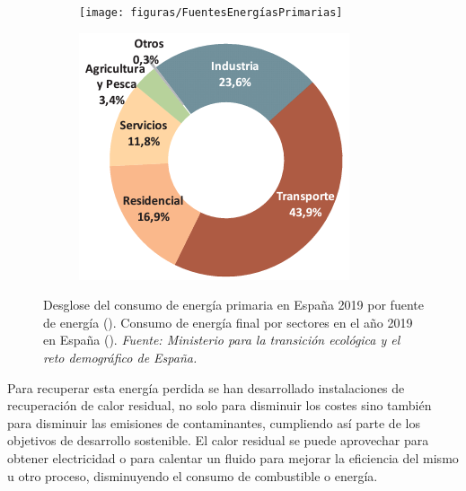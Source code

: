 \begin{figure}[H]
	\centering
	\begin{subfigure}[b]{0.48\textwidth}
		\texttt{[image: figuras/FuentesEnergíasPrimarias]}
		\caption{
		}
		\label{fig:fuentesenergiasprimarias}
	\end{subfigure}
	\hfill
	\begin{subfigure}[b]{0.48\textwidth}
		\centering
		\includegraphics[width=\textwidth]{figuras/consumoEnergiaFinalPorSectores_2019}
		\caption{
		}
		\label{fig:consumoenergiafinalporsectores2019}
	\end{subfigure}
\caption[Desglose del consumo de energía primaria en España 20]{Desglose del consumo de energía primaria en España 2019 por fuente de energía (). Consumo de energía final por sectores en el año 2019 en España (). \textit{Fuente:  Ministerio para la transición ecológica y el reto demográfico de España.} }
 \label{fig:consumosEnergiasCategorias}
\end{figure}

Para recuperar esta energía perdida se han desarrollado instalaciones de recuperación de calor residual, no solo para disminuir los costes sino también para disminuir las emisiones de contaminantes, cumpliendo así parte de los objetivos de desarrollo sostenible. El calor residual se puede aprovechar para obtener electricidad o para calentar un fluido para mejorar la eficiencia del mismo u otro proceso, disminuyendo el consumo de combustible o energía.\\

